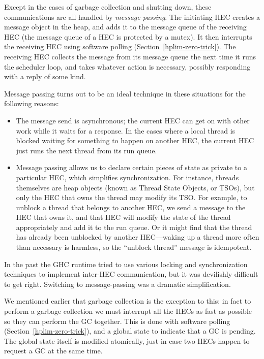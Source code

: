 Except in the cases of garbage collection and shutting down, these
communications are all handled by \emph{message passing}.  The
initiating HEC creates a message object in the heap, and adds it to
the message queue of the receiving HEC (the message queue of a HEC is
protected by a mutex).  It then interrupts the receiving HEC using
software polling (Section~\ref{hplim-zero-trick}).  The receiving HEC
collects the message from its message queue the next time it runs the
scheduler loop, and takes whatever action is necessary, possibly
responding with a reply of some kind.

Message passing turns out to be an ideal technique in these situations
for the following reasons:

\begin{itemize}
\item The message send is asynchronous; the current HEC can get on
  with other work while it waits for a response.  In the cases where a
  local thread is blocked waiting for something to happen on another
  HEC, the current HEC just runs the next thread from its run queue.

\item Message passing allows us to declare certain pieces of state as
  private to a particular HEC, which simplifies synchronization.  For
  instance, threads themselves are heap objects (known as Thread State
  Objects, or TSOs), but only the HEC that owns the thread may modify
  its TSO.  For example, to unblock a thread that belongs to another
  HEC, we send a message to the HEC that owns it, and that HEC will
  modify the state of the thread appropriately and add it to the run
  queue.  Or it might find that the thread has already been unblocked
  by another HEC---waking up a thread more often than necessary is
  harmless, so the ``unblock thread'' message is idempotent.
\end{itemize}

In the past the GHC runtime tried to use various locking and
synchronization techniques to implement inter-HEC communication, but
it was devilishly difficult to get right.  Switching to
message-passing was a dramatic simplification.

We mentioned earlier that garbage collection is the exception to this:
in fact to perform a garbage collection we must interrupt all the HECs
as fast as possible so they can perform the GC together.  This is done
with software polling (Section~\ref{hplim-zero-trick}), and a global
state to indicate that a GC is pending.  The global state itself is
modified atomically, just in case two HECs happen to request a GC at
the same time.

